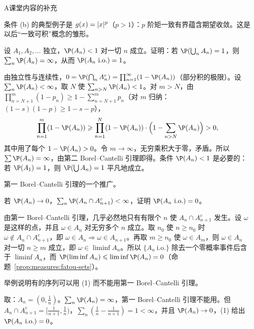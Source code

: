 \begin{exercises}{A}{课堂内容的补充}
\begin{solution}
条件 (b) 的典型例子是 $g(x)=\lvert x\rvert^p$（$p>1$）：$p$ 阶矩一致有界蕴含期望收敛。这是以后“一致可积”概念的雏形。
\end{solution}

\item\label{ex:borel-cantelli:A5} 设 $A_1,A_2,\dots$ 独立，$\P(A_n)<1$ 对一切 $n$ 成立。证明：若 $\P(\bigcup_nA_n)=1$，则 $\sum_n\P(A_n)=\infty$，从而 $\P(A_n\ \text{i.o.})=1$。
\begin{solution}
由独立性与连续性，$0=\P(\bigcap_nA_n^c)=\prod_{n=1}^\infty(1-\P(A_n))$（部分积的极限）。设 $\sum_n\P(A_n)<\infty$，取 $N$ 使 $\sum_{n>N}\P(A_n)<1$。对 $m>N$，由 $\prod_{n=N+1}^m(1-p_n)\geqslant1-\sum_{n=N+1}^mp_n$（对 $m$ 归纳：$(1-s)(1-p)\geqslant1-s-p$），
\[
\prod_{n=1}^m(1-\P(A_n))\geqslant\prod_{n=1}^N(1-\P(A_n))\cdot\Bigl(1-\sum_{n>N}\P(A_n)\Bigr)>0,
\]
其中用了每个 $1-\P(A_n)>0$。令 $m\to\infty$，无穷乘积大于零，矛盾。所以 $\sum \P(A_n)=\infty$，由第二 Borel--Cantelli 引理即得。条件 $\P(A_n)<1$ 是必要的：若 $\P(A_1)=1$，则 $\P(\bigcup A_n)=1$ 平凡地成立。
\end{solution}

\item\label{ex:borel-cantelli:A6} 第一 Borel--Cantelli 引理的一个推广。
\begin{questions}
\item 若 $\P(A_n)\to0$，$\sum_n\P(A_n\cap A_{n+1}^c)<\infty$，证明 $\P(A_n\ \text{i.o.})=0$。
\begin{solution}
由第一 Borel--Cantelli 引理，几乎必然地只有有限个 $n$ 使 $A_n\cap A_{n+1}^c$ 发生。设 $\omega$ 是这样的点，并且 $\omega\in A_n$ 对无穷多个 $n$ 成立。取 $n_0$ 使 $n\geqslant n_0$ 时 $\omega\notin A_n\cap A_{n+1}^c$，即 $\omega\in A_n\Rightarrow\omega\in A_{n+1}$。再取 $m\geqslant n_0$ 使 $\omega\in A_m$，则 $\omega\in A_n$ 对一切 $n\geqslant m$ 成立，即 $\omega\in\liminf A_n$。所以 $\{A_n\ \text{i.o.}\}$ 除去一个零概率事件后含于 $\liminf A_n$，而 $\P(\liminf A_n)\leqslant\liminf \P(A_n)=0$（命题~\ref{prop:measures:fatou-sets}）。
\end{solution}
\item 举例说明有的序列可以用 (1) 而不能用第一 Borel--Cantelli 引理。
\begin{solution}
取：$A_n=(0,\frac1n)$。$\sum_n\P(A_n)=\infty$，第一 Borel--Cantelli 引理不能用。但 $A_n\cap A_{n+1}^c=[\frac1{n+1},\frac1n)$，$\sum_n(\frac1n-\frac1{n+1})=1<\infty$，并且 $\P(A_n)\to0$，(1) 给出 $\P(A_n\ \text{i.o.})=0$。
\end{solution}
\end{questions}


\end{exercises}
